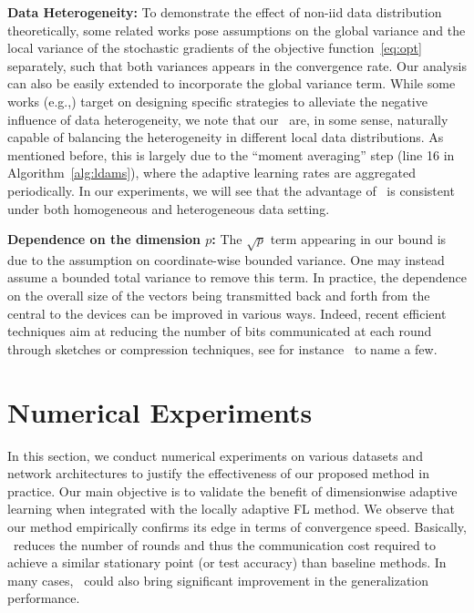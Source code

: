 \documentclass[twoside]{article}
\begin{document}
\medskip
\textbf{Data Heterogeneity:} To demonstrate the effect of non-iid data distribution theoretically, some related works pose assumptions on the global variance and the local variance of the stochastic gradients of the objective function~\eqref{eq:opt} separately, such that both variances appears in the convergence rate. Our analysis can also be easily extended to incorporate the global variance term. While some works (e.g.,\citet{karimireddy2019scaffold}) target on designing specific strategies to alleviate the negative influence of data heterogeneity, we note that our \algo\ are, in some sense, naturally capable of balancing the heterogeneity in different local data distributions. As mentioned before, this is largely due to the ``moment averaging'' step (line 16 in Algorithm~\ref{alg:ldams}), where the adaptive learning rates are aggregated periodically. In our experiments, we will see that the advantage of \algo\ is consistent under both homogeneous and heterogeneous data setting. 

 \medskip
 \textbf{Dependence on the dimension $p$:} The $\sqrt p$ term appearing in our bound is due to the assumption on coordinate-wise bounded variance. One may instead assume a bounded total variance to remove this term. 
 In practice, the dependence on the overall size of the vectors being transmitted back and forth from the central to the devices can be improved in various ways. 
 Indeed, recent efficient techniques aim at reducing the number of bits communicated at each round through sketches or compression techniques, see for instance~\citet{ivkin2019communication,li2019privacy} to name a few.




\section{Numerical Experiments}\label{sec:numerical}

In this section, we conduct numerical experiments on various datasets and network architectures to justify the effectiveness of our proposed method in practice. Our main objective is to validate the benefit of dimensionwise adaptive learning when integrated with the locally adaptive FL method.
We observe that our method empirically confirms its edge in terms of convergence speed.
Basically, \algo\ reduces the number of rounds and thus the communication cost required to achieve a similar stationary point (or test accuracy) than baseline methods. In many cases, \algo\ could also bring significant improvement in the generalization performance.
\end{document}
